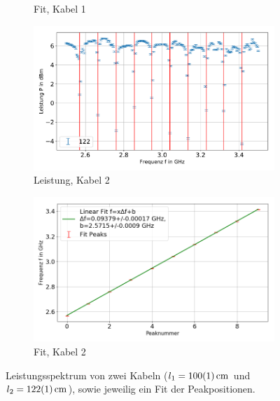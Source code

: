 \documentclass[
	a4paper,
	12pt,
	pagesize,
	ngerman
]{scrartcl}
\begin{document}
\begin{figure}[H]
\begin{subfigure}[b]{0.495\textwidth}
            \caption[]%
            {Fit, Kabel 1}
            \label{fig_fit_100}
        \end{subfigure}
        \begin{subfigure}[b]{0.495\textwidth}
            \centering
            \includegraphics[width=\textwidth]{img/122}
            \caption%
            {Leistung, Kabel 2}
            \label{fig_leistung_122}
        \end{subfigure}
        \hfill
        \begin{subfigure}[b]{0.495\textwidth}
            \centering
            \includegraphics[width=\textwidth]{img/122_fit}
            \caption[]%
            {Fit, Kabel 2}
            \label{fig_fit_122}
        \end{subfigure}
        \caption%
        {
					Leistungsspektrum von zwei Kabeln ($l_1 = \SI{100+-1}{cm}$ und $l_2 = \SI{122+-1}{cm}$), sowie jeweilig ein Fit der Peakpositionen.
				}
        \label{fig_steh_well}
    \end{figure}
\end{document}
